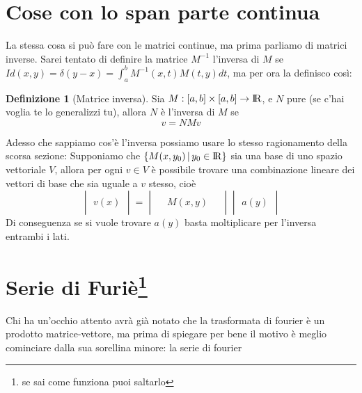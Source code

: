 \documentclass[11pt,a4paper]{article}
\theoremstyle{definition}
\newtheorem{definizione}{Definizione}
\theoremstyle{plain}
\theoremstyle{plain}
\begin{document}
		\section{Cose con lo span parte continua}
			La stessa cosa si può fare con le matrici continue, ma prima parliamo di matrici inverse.
			Sarei tentato di definire la matrice $M^{-1}$ l'inversa di $M$ se $Id(x,y)=\delta (y-x)=\int_a^b M^{-1}(x,t) M(t,y) dt$, ma per ora la definisco così:\newline
			\begin{definizione}[Matrice inversa]
				Sia $M:[a,b]\times [a,b]\rightarrow \rm I\!R$, e $N$ pure (se c'hai voglia te lo generalizzi tu), allora $N$ è l'inversa di $M$ se
				\begin{equation}
					v=NMv
				\end{equation}
			\end{definizione}
			Adesso che sappiamo cos'è l'inversa possiamo usare lo stesso ragionamento della scorsa sezione: Supponiamo che $\{M(x,y_0)\,|\, y_0\in \rm I\!R \}$ sia una base di uno spazio vettoriale $V$, allora per ogni $v\in V$ è possibile trovare una combinazione lineare dei vettori di base che sia uguale a $v$ stesso, cioè
			\begin{equation}
				\begin{vmatrix}
					\\
					v(x)\\
					\quad
				\end{vmatrix}
				=
				\begin{vmatrix}
					\, & & \, \\
					& M(x,y) & \\
					& & 
				\end{vmatrix}
				\begin{vmatrix}
					\\
					a(y)\\
					\quad
				\end{vmatrix}
			\end{equation}
			Di conseguenza se si vuole trovare $a(y)$ basta moltiplicare per l'inversa entrambi i lati.

		\section{Serie di Furiè\footnote{se sai come funziona puoi saltarlo}}
			Chi ha un'occhio attento avrà già notato che la trasformata di fourier è un prodotto matrice-vettore, ma prima di spiegare per bene il motivo è meglio cominciare dalla sua sorellina minore: la serie di fourier\newline 
\end{document}
